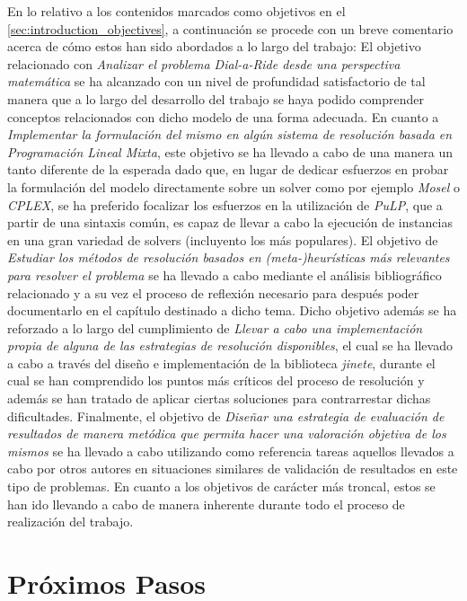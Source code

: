 \documentclass{subfiles}
\begin{document}
      En lo relativo a los contenidos marcados como objetivos en el \cref{sec:introduction_objectives}, a continuación se procede con un breve comentario acerca de cómo estos han sido abordados a lo largo del trabajo: El objetivo relacionado con \emph{Analizar el problema Dial-a-Ride desde una perspectiva matemática} se ha alcanzado con un nivel de profundidad satisfactorio de tal manera que a lo largo del desarrollo del trabajo se haya podido comprender conceptos relacionados con dicho modelo de una forma adecuada. En cuanto a \emph{Implementar la formulación del mismo en algún sistema de resolución basada en Programación Lineal Mixta}, este objetivo se ha llevado a cabo de una manera un tanto diferente de la esperada dado que, en lugar de dedicar esfuerzos en probar la formulación del modelo directamente sobre un solver como por ejemplo \emph{Mosel} o \emph{CPLEX}, se ha preferido focalizar los esfuerzos en la utilización de \emph{PuLP}, que a partir de una sintaxis común, es capaz de llevar a cabo la ejecución de instancias en una gran variedad de solvers (incluyento los más populares). El objetivo de \emph{Estudiar los métodos de resolución basados en (meta-)heurísticas más relevantes para resolver el problema} se ha llevado a cabo mediante el análisis bibliográfico relacionado y a su vez el proceso de reflexión necesario para después poder documentarlo en el capítulo destinado a dicho tema. Dicho objetivo además se ha reforzado a lo largo del cumplimiento de \emph{Llevar a cabo una implementación propia de alguna de las estrategias de resolución disponibles}, el cual se ha llevado a cabo a través del diseño e implementación de la biblioteca \emph{jinete}, durante el cual se han comprendido los puntos más críticos del proceso de resolución y además se han tratado de aplicar ciertas soluciones para contrarrestar dichas dificultades. Finalmente, el objetivo de \emph{Diseñar una estrategia de evaluación de resultados de manera metódica que permita hacer una valoración objetiva de los mismos} se ha llevado a cabo utilizando como referencia tareas aquellos llevados a cabo por otros autores en situaciones similares de validación de resultados en este tipo de problemas. En cuanto a los objetivos de carácter más troncal, estos se han ido llevando a cabo de manera inherente durante todo el proceso de realización del trabajo.

    \section{Próximos Pasos}
    \label{sec:conclusion_next_steps}
\end{document}
